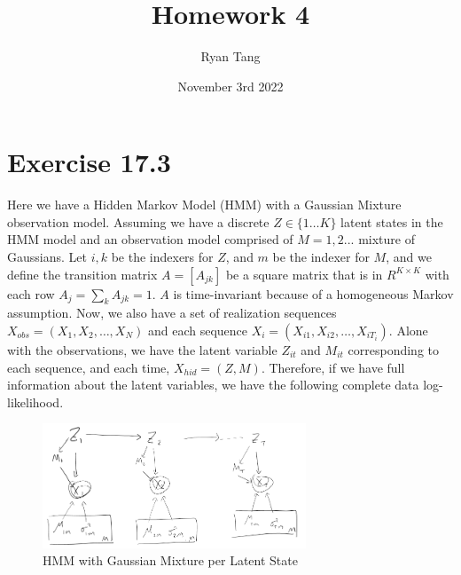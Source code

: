 \documentclass[11pt, letterpaper]{article}
\title{Homework 4}
\author{Ryan Tang}
\date{November 3rd 2022}
\begin{document}
\maketitle

\section{Exercise 17.3}
Here we have a Hidden Markov Model (HMM) with a Gaussian Mixture observation model. Assuming we have a discrete $Z \in \{1 \dots K\}$ latent states in the HMM model and an observation model comprised of $M = 1,2... $ mixture of Gaussians. Let $i, k$ be the indexers for $Z$, and $m$ be the indexer for $M$, and we define the transition matrix $A = [A_{jk}]$ be a square matrix that is in $R^{K \times K}$ with each row $A_j = \sum_k A_{jk} = 1$. $A$ is time-invariant because of a homogeneous Markov assumption. Now, we also have a set of realization sequences $X_{obs} = (X_1, X_2, \dots, X_N)$ and each sequence $X_i = (X_{i1}, X_{i2}, \dots, X_{iT_i})$. Alone with the observations, we have the latent variable $Z_{it}$ and $M_{it}$ corresponding to each sequence, and each time, $X_{hid} = (Z, M)$. Therefore, if we have full information about the latent variables, we have the following complete data log-likelihood.

\begin{figure}[!h]
  \centering
  \includegraphics[width=0.7\textwidth]{17.3.png}
  \captionsetup{justification=centering}
  \caption{HMM with Gaussian Mixture per Latent State}
\end{figure}
\end{document}
